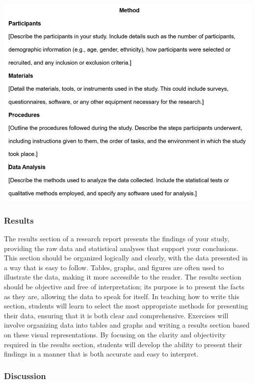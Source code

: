 \documentclass[
]{book}
\begin{document}
\includegraphics[width=1\textwidth,height=\textheight]{images/fig083.jpg}

\subsubsection*{Results}\label{results}

The results section of a research report presents the findings of your study, providing the raw data and statistical analyses that support your conclusions. This section should be organized logically and clearly, with the data presented in a way that is easy to follow. Tables, graphs, and figures are often used to illustrate the data, making it more accessible to the reader. The results section should be objective and free of interpretation; its purpose is to present the facts as they are, allowing the data to speak for itself. In teaching how to write this section, students will learn to select the most appropriate methods for presenting their data, ensuring that it is both clear and comprehensive. Exercises will involve organizing data into tables and graphs and writing a results section based on these visual representations. By focusing on the clarity and objectivity required in the results section, students will develop the ability to present their findings in a manner that is both accurate and easy to interpret.

\subsubsection*{Discussion}\label{discussion}
\end{document}
